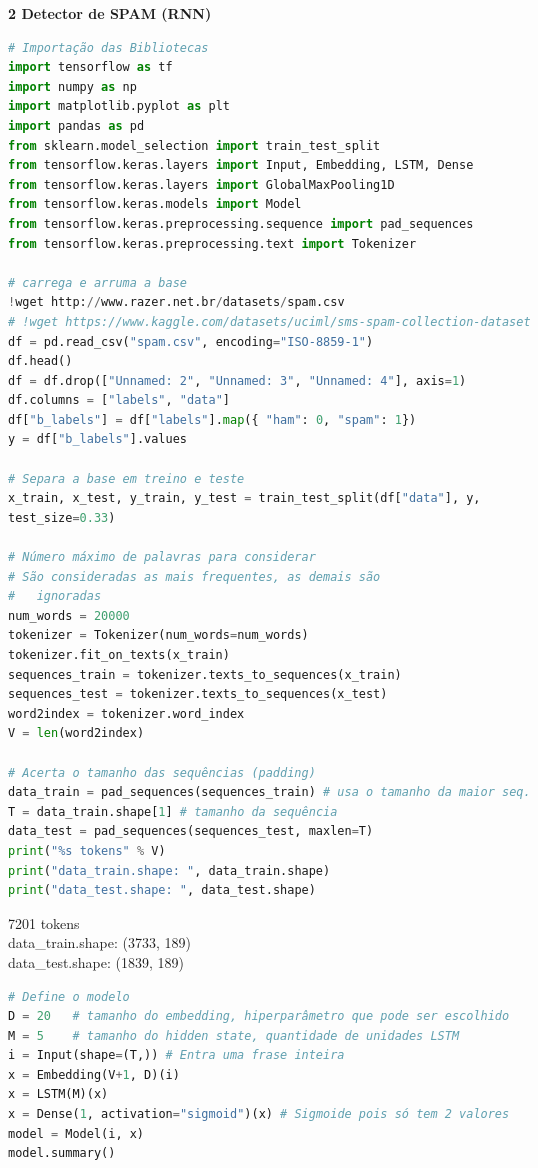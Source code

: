 \begin{adjustwidth}{1em}{}
\textbf{2 Detector de SPAM (RNN)}
\end{adjustwidth}
\begin{lstlisting}[language=Python, style=input]
# Importação das Bibliotecas
import tensorflow as tf
import numpy as np
import matplotlib.pyplot as plt
import pandas as pd
from sklearn.model_selection import train_test_split
from tensorflow.keras.layers import Input, Embedding, LSTM, Dense
from tensorflow.keras.layers import GlobalMaxPooling1D
from tensorflow.keras.models import Model
from tensorflow.keras.preprocessing.sequence import pad_sequences
from tensorflow.keras.preprocessing.text import Tokenizer

# carrega e arruma a base
!wget http://www.razer.net.br/datasets/spam.csv
# !wget https://www.kaggle.com/datasets/uciml/sms-spam-collection-dataset
df = pd.read_csv("spam.csv", encoding="ISO-8859-1")
df.head()
df = df.drop(["Unnamed: 2", "Unnamed: 3", "Unnamed: 4"], axis=1)
df.columns = ["labels", "data"]
df["b_labels"] = df["labels"].map({ "ham": 0, "spam": 1})
y = df["b_labels"].values

# Separa a base em treino e teste
x_train, x_test, y_train, y_test = train_test_split(df["data"], y,
test_size=0.33)

# Número máximo de palavras para considerar
# São consideradas as mais frequentes, as demais são
#   ignoradas
num_words = 20000
tokenizer = Tokenizer(num_words=num_words)
tokenizer.fit_on_texts(x_train)
sequences_train = tokenizer.texts_to_sequences(x_train)
sequences_test = tokenizer.texts_to_sequences(x_test)
word2index = tokenizer.word_index
V = len(word2index)

# Acerta o tamanho das sequências (padding)
data_train = pad_sequences(sequences_train) # usa o tamanho da maior seq.
T = data_train.shape[1] # tamanho da sequência
data_test = pad_sequences(sequences_test, maxlen=T)
print("%s tokens" % V)
print("data_train.shape: ", data_train.shape)
print("data_test.shape: ", data_test.shape)
\end{lstlisting}

\begin{tcolorbox}[myoutputstyle]
7201 tokens\\
data\_train.shape:  (3733, 189)\\
data\_test.shape:  (1839, 189)
\end{tcolorbox}


\begin{lstlisting}[language=Python, style=input]
# Define o modelo
D = 20   # tamanho do embedding, hiperparâmetro que pode ser escolhido
M = 5    # tamanho do hidden state, quantidade de unidades LSTM
i = Input(shape=(T,)) # Entra uma frase inteira
x = Embedding(V+1, D)(i)
x = LSTM(M)(x)
x = Dense(1, activation="sigmoid")(x) # Sigmoide pois só tem 2 valores
model = Model(i, x)
model.summary()
\end{lstlisting}


